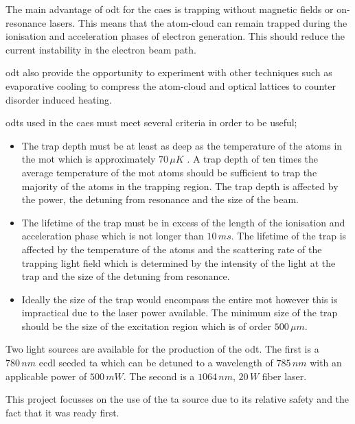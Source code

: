 The main advantage of \gls{odt} for the \gls{caes} is trapping without magnetic fields or on-resonance lasers. This means that the atom-cloud can remain trapped during the ionisation and acceleration phases of electron generation. This should reduce the current instability in the electron beam path.

\Gls{odt} also provide the opportunity to experiment with other techniques such as evaporative cooling to compress the atom-cloud and optical lattices\cite{fallani_bose-einstein_2005} to counter disorder induced heating. 

\Glspl{odt} used in the \gls{caes} must meet several criteria in order to be useful;
\begin{itemize}
    \item The trap depth must be at least as deep as the temperature of the atoms in the \gls{mot} which is approximately $70\,\unit{\mu K}$ \cite{mcculloch_arbitrarily_2011}. A trap depth of ten times the average temperature of the \gls{mot} atoms should be sufficient to trap the majority of the atoms in the trapping region. The trap depth is affected by the power, the detuning from resonance and the size of the beam.
    \item The lifetime of the trap must be in excess of the length of the  ionisation and acceleration phase which is not longer than $10\,\unit{ms}$. The lifetime of the trap is affected by the temperature of the atoms and the scattering rate of the trapping light field which is determined by the intensity of the light at the trap and the size of the detuning from resonance.
    \item Ideally the size of the trap would encompass the entire \gls{mot} however this is impractical due to the laser power available. The minimum size of the trap should be the size of the excitation region which is of order $500\,\unit{\mu m}$\cite{mcculloch_electron_2012}.
\end{itemize}

Two light sources are available for the production of the \gls{odt}. The first is a $780\,\unit{nm}$ \gls{ecdl} seeded \gls{ta} which can be detuned to a wavelength of $785\,\unit{nm}$ with an applicable power of $500\,\unit{mW}$. The second is a $1064\,\unit{nm}$, $20\,\unit{W}$ fiber laser.

This project focusses on the use of the \gls{ta} source due to its relative safety and the fact that it was ready first.
